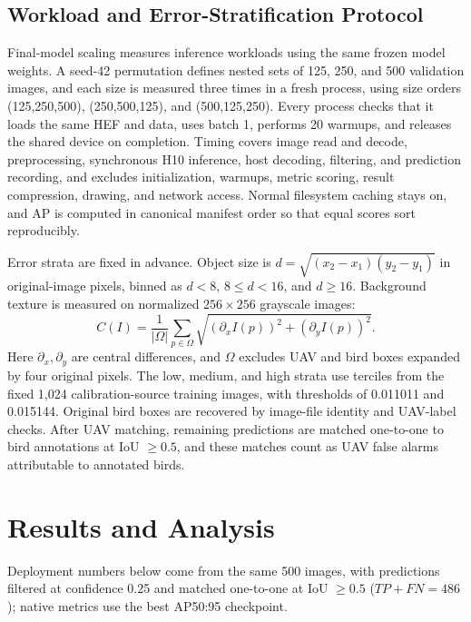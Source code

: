 \documentclass[lettersize,journal]{IEEEtran}
\begin{document}
\subsection{Workload and Error-Stratification Protocol}
Final-model scaling measures inference workloads using the same frozen model weights. A seed-42 permutation defines nested sets of 125, 250, and 500 validation images, and each size is measured three times in a fresh process, using size orders (125,250,500), (250,500,125), and (500,125,250). Every process checks that it loads the same HEF and data, uses batch 1, performs 20 warmups, and releases the shared device on completion. Timing covers image read and decode, preprocessing, synchronous H10 inference, host decoding, filtering, and prediction recording, and excludes initialization, warmups, metric scoring, result compression, drawing, and network access. Normal filesystem caching stays on, and AP is computed in canonical manifest order so that equal scores sort reproducibly.

Error strata are fixed in advance. Object size is $d=\sqrt{(x_2-x_1)(y_2-y_1)}$ in original-image pixels, binned as $d<8$, $8\leq d<16$, and $d\geq16$. Background texture is measured on normalized $256\times256$ grayscale images:
\begin{equation}
C(I)=\frac{1}{|\Omega|}\sum_{p\in\Omega}\sqrt{(\partial_x I(p))^2+(\partial_y I(p))^2}.
\label{eq:clutter}
\end{equation}
Here $\partial_x,\partial_y$ are central differences, and $\Omega$ excludes UAV and bird boxes expanded by four original pixels. The low, medium, and high strata use terciles from the fixed 1,024 calibration-source training images, with thresholds of 0.011011 and 0.015144. Original bird boxes are recovered by image-file identity and UAV-label checks. After UAV matching, remaining predictions are matched one-to-one to bird annotations at IoU $\geq0.5$, and these matches count as UAV false alarms attributable to annotated birds.

\section{Results and Analysis}
Deployment numbers below come from the same 500 images, with predictions filtered at confidence 0.25 and matched one-to-one at IoU $\geq0.5$ ($TP+FN=486$); native metrics use the best AP50:95 checkpoint.
\end{document}
